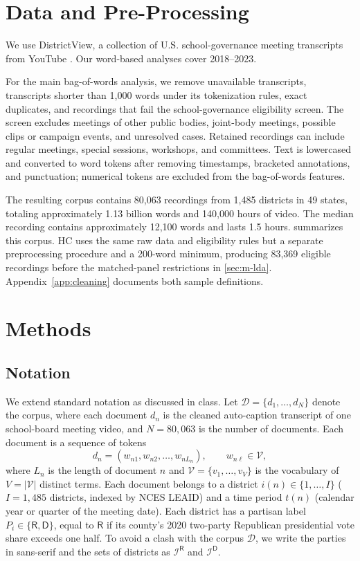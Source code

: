 \documentclass[12pt]{article}
\begin{document}
\section{Data and Pre-Processing}\label{sec:data}

We use DistrictView, a collection of U.S. school-governance
meeting transcripts from YouTube
\citep{districtview_2026,holman_et_al_2026}.
Our word-based analyses cover 2018--2023.

For the main bag-of-words analysis, we remove unavailable
transcripts, transcripts shorter than 1,000 words under its
tokenization rules, exact duplicates, and recordings that fail
the school-governance eligibility screen. The screen excludes
meetings of other public bodies, joint-body meetings, possible
clips or campaign events, and unresolved cases. Retained
recordings can include regular meetings, special sessions,
workshops, and committees. Text is lowercased and converted
to word tokens after removing timestamps, bracketed annotations,
and punctuation; numerical tokens are excluded from the
bag-of-words features.

The resulting corpus contains 80,063 recordings from 1,485
districts in 49 states, totaling approximately 1.13 billion words
and 140,000 hours of video. The median recording contains
approximately 12,100 words and lasts 1.5 hours.
 summarizes this corpus. HC uses the same raw
data and eligibility rules but a separate preprocessing procedure
and a 200-word minimum, producing 83,369 eligible recordings
before the matched-panel restrictions in \cref{sec:m-lda}.
Appendix~\ref{app:cleaning} documents both sample definitions.

\section{Methods}

\subsection{Notation}

We extend standard notation as discussed in class. Let $\mathcal{D} = \{d_1, \dots, d_N\}$ denote the corpus, where each document $d_n$ is the
cleaned auto-caption transcript of one school-board meeting video, and $N = 80{,}063$ is the number of documents.  Each document is a sequence of tokens
\[
  d_n = (w_{n1}, w_{n2}, \dots, w_{n L_n}), \qquad w_{n\ell} \in \mathcal{V},
\]
where $L_n$ is the length of document $n$ and $\mathcal{V} = \{v_1, \dots, v_V\}$ is the
vocabulary of $V = |\mathcal{V}|$ distinct terms. Each document belongs to a district
$i(n) \in \{1, \dots, I\}$ ($I = 1{,}485$ districts, indexed by NCES LEAID) and a time period
$t(n)$ (calendar year or quarter of the meeting date). Each district has a partisan label
$P_i \in \{\mathsf{R}, \mathsf{D}\}$, equal to $\mathsf{R}$ if its county's 2020 two-party
Republican presidential vote share exceeds one half. To avoid a clash with the corpus
$\mathcal{D}$, we write the parties in sans-serif and the sets of districts as
$\mathcal{I}^{\mathsf{R}}$ and $\mathcal{I}^{\mathsf{D}}$.
\end{document}

